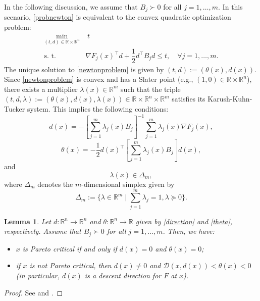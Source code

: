 \documentclass[11pt]{article}
\newtheorem{lemma}[theorem]{Lemma}
\numberwithin{assumption}{section}
\newcommand{\R}{\mathbb{R}}
\newcommand{\D}{\mathcal{D}}
\newcommand{\ds}{\displaystyle}
\begin{document}
In the following discussion, we assume that $B_j\succ 0$ for all $j=1,\ldots,m$. In this scenario, \eqref{probnewton} is equivalent to the convex quadratic optimization problem:
\begin{equation} \label{newtonproblem}
 \begin{array}{cl}
\ds\min_{(t,d)\in\R\times\R^n}    & \;  t          \\
\mbox{s. t.} & \nabla F_j (x)^\top d + \dfrac{1}{2}d^\top B_j d  \leq t,  \quad \forall j = 1,\dots,m.
\end{array}
\end{equation}
The unique solution to \eqref{newtonproblem} is given by $(t,d):=(\theta(x), d(x))$. Since \eqref{newtonproblem} is convex and has a Slater point (e.g., $(1, 0)\in\R\times\R^n$), there exists a multiplier $\lambda(x) \in \mathbb{R}^m$ such that the triple $(t,d,\lambda):=(\theta(x), d(x),\lambda(x)) \in\R\times\R^n\times\R^m$ satisfies its Karush-Kuhn-Tucker system.
This implies the following conditions:
\begin{equation}\label{dN}
d(x) = - \left[ \sum_{j=1}^{m} \lambda_j(x)B_j \right]^{-1} \sum_{j=1}^{m}\lambda_j(x)\nabla F_j (x),
\end{equation}
\begin{equation}\label{thetaN}
\theta(x) = -\frac{1}{2} d(x)^\top \left[ \sum_{j=1}^{m} \lambda_j(x)B_j \right] d(x),
\end{equation}
and
\begin{equation}\label{lambdaN}
 \lambda(x) \in \Delta_m,
\end{equation}
where $\Delta_m$ denotes the $m$-dimensional simplex given by
  $$\Delta_m:=\{\lambda \in\R^m \mid \sum_{j=1}^m \lambda_j =1, \lambda \succeq 0\}.$$
  
\begin{lemma}\label{l:pareto} 
Let $d:\R^n\to\R^n$ and $\theta:\R^n\to\R$ given by \eqref{direction} and \eqref{theta}, respectively. Assume that $B_j\succ 0$ for all $j=1,\ldots,m$. Then, we have:
	\begin{itemize}
\item[(i)] $x$ is Pareto critical if and only if $d(x)=0$ and $\theta(x)=0$;
\item[(ii)] if $x$ is not Pareto critical, then $d(x)\neq0$ and $\D(x,d(x))< \theta(x)<0$ (in particular, $d(x)$ is a descent direction for $F$ at $x$).
	\end{itemize}
\end{lemma}
\begin{proof} 
See  \cite[Lemma 3.2]{mauriciobenarfliege} and  \cite[Lemma 2]{POVALEJ2014765}.
  \end{proof}
\end{document}
